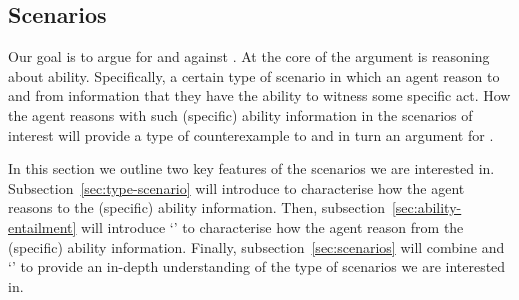



\subsection{Scenarios}
\label{sec:cases-interest}

Our goal is to argue for \EAS{} and against \ESU{}.
At the core of the argument is reasoning about ability.
Specifically, a certain type of scenario in which an agent reason to and from information that they have the ability to witness some specific act.
How the agent reasons with such (specific) ability information in the scenarios of interest will provide a type of counterexample to \ESU{} and in turn an argument for \EAS{}.

In this section we outline two key features of the scenarios we are interested in.
Subsection~\ref{sec:type-scenario} will introduce \gsi{-} to characterise how the agent reasons to the (specific) ability information.
Then, subsection~\ref{sec:ability-entailment} will introduce `' to characterise how the agent reason from the (specific) ability information.
Finally, subsection~\ref{sec:scenarios} will combine \gsi{-} and `' to provide an in-depth understanding of the type of scenarios we are interested in.


